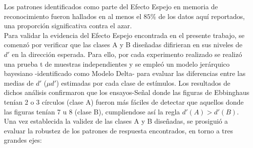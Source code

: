 Los patrones identificados como parte del Efecto Espejo en memoria de reconocimiento fueron hallados en al menos el $85\%$ de los datos aquí reportados, una proporción significativa contra el azar.\\

Para validar la evidencia del Efecto Espejo encontrada en el presente trabajo, se comenzó por verificar que las clases A y B diseñadas difirieran en sus niveles de $d'$ en la dirección esperada. Para ello, por cada experimento realizado se realizó una prueba t de muestras independientes y se empleó un modelo jerárquico bayesiano -identificado como Modelo Delta- para evaluar las diferencias entre las medias de $d'$  ($\mu d'$) estimadas por cada clase de estímulos. Los resultados de dichos análisis confirmaron que los ensayos-Señal donde las figuras de Ebbinghaus tenían 2 o 3 círculos (clase A) fueron más fáciles de detectar que aquellos donde las figuras tenían 7 u 8 (clase B), cumpliendose así la regla $d'(A) > d'(B)$.\\


Una vez establecida la validez de las clases A y B diseñadas, se prosiguió a evaluar la robustez de los patrones de respuesta encontrados, en torno a tres grandes ejes:\\

